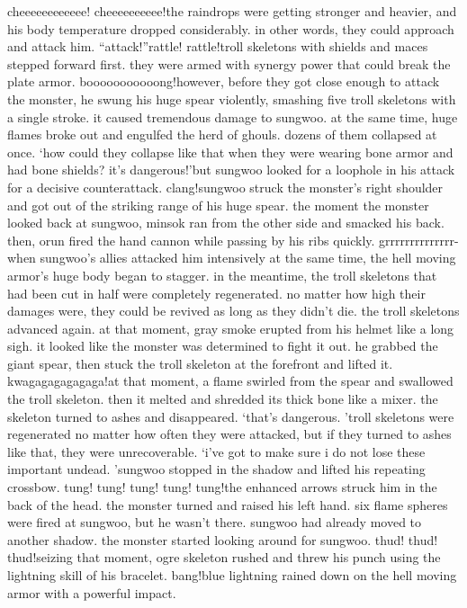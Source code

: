 cheeeeeeeeeeee! cheeeeeeeeee!the raindrops were getting stronger and heavier, and his body temperature dropped considerably.
 in other words, they could approach and attack him.
“attack!”rattle! rattle!troll skeletons with shields and maces stepped forward first.
 they were armed with synergy power that could break the plate armor.
booooooooooong!however, before they got close enough to attack the monster, he swung his huge spear violently, smashing five troll skeletons with a single stroke.
it caused tremendous damage to sungwoo.
 at the same time, huge flames broke out and engulfed the herd of ghouls.
 dozens of them collapsed at once.
‘how could they collapse like that when they were wearing bone armor and had bone shields? it’s dangerous!’but sungwoo looked for a loophole in his attack for a decisive counterattack.
clang!sungwoo struck the monster’s right shoulder and got out of the striking range of his huge spear.
the moment the monster looked back at sungwoo, minsok ran from the other side and smacked his back.
 then, orun fired the hand cannon while passing by his ribs quickly.
grrrrrrrrrrrrrr-when sungwoo’s allies attacked him intensively at the same time, the hell moving armor’s huge body began to stagger.
 in the meantime, the troll skeletons that had been cut in half were completely regenerated.
 no matter how high their damages were, they could be revived as long as they didn’t die.
 the troll skeletons advanced again.
at that moment, gray smoke erupted from his helmet like a long sigh.
 it looked like the monster was determined to fight it out.
 he grabbed the giant spear, then stuck the troll skeleton at the forefront and lifted it.
kwagagagagagaga!at that moment, a flame swirled from the spear and swallowed the troll skeleton.
 then it melted and shredded its thick bone like a mixer.
 the skeleton turned to ashes and disappeared.
‘that’s dangerous.
’troll skeletons were regenerated no matter how often they were attacked, but if they turned to ashes like that, they were unrecoverable.
‘i’ve got to make sure i do not lose these important undead.
’sungwoo stopped in the shadow and lifted his repeating crossbow.
tung! tung! tung! tung! tung!the enhanced arrows struck him in the back of the head.
 the monster turned and raised his left hand.
 six flame spheres were fired at sungwoo, but he wasn’t there.
 sungwoo had already moved to another shadow.
the monster started looking around for sungwoo.
thud! thud! thud!seizing that moment, ogre skeleton rushed and threw his punch using the lightning skill of his bracelet.
bang!blue lightning rained down on the hell moving armor with a powerful impact.

